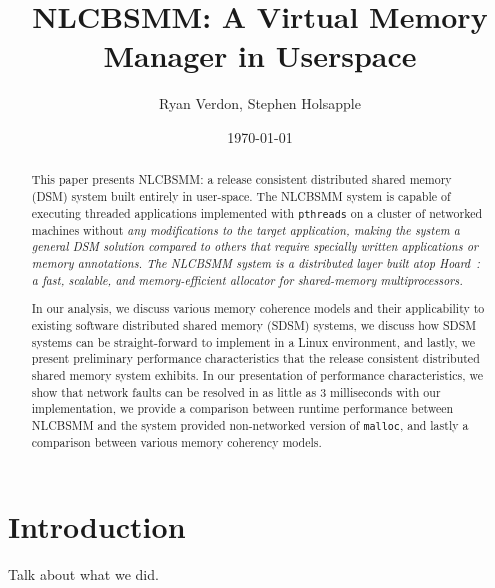 \documentclass[10pt,conference]{IEEEtran}
\begin{document}
\title{\vfill NLCBSMM: A Virtual Memory Manager in Userspace} 
\author{Ryan Verdon, Stephen Holsapple}
\date{\today}
\maketitle

\def \projname {NLCBSMM}
\newtheorem{definition}{Definition}[section]
\newtheorem{condition}{Condition}[section]

\begin{abstract}
This paper presents \projname{}: a release consistent distributed shared memory (DSM) system built entirely in user-space.  The \projname{} system is capable of executing threaded applications implemented with \verb,pthreads, on a cluster of networked machines without \em any \em modifications to the target application, making the system a general DSM solution compared to others that require specially written applications or memory annotations.  The \projname{} system is a distributed layer built atop Hoard~\cite{Berger:1999:HFS:899944, Berger:2000:HSM:356989.357000}: a fast, scalable, and memory-efficient allocator for shared-memory multiprocessors.

In our analysis, we discuss various memory coherence models and their applicability to existing software distributed shared memory (SDSM) systems, we discuss how SDSM systems can be straight-forward to implement in a Linux environment, and lastly, we present preliminary performance characteristics that the release consistent distributed shared memory system exhibits.  In our presentation of performance characteristics, we show that network faults can be resolved in as little as 3 milliseconds with our implementation, we provide a comparison between runtime performance between \projname{} and the system provided non-networked version of \verb,malloc,, and lastly a comparison between various memory coherency models.

\end{abstract}

\section{Introduction}

Talk about what we did.










\end{document}
